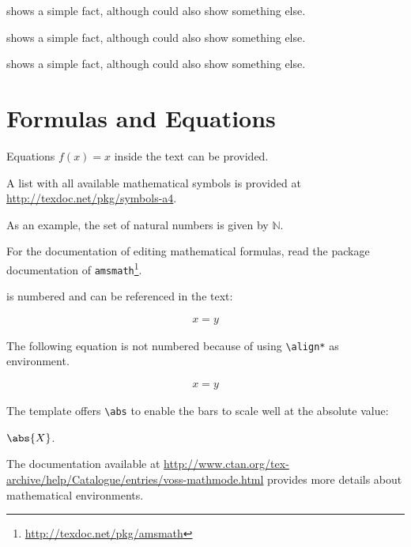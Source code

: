 \begin{ltgexample}
 shows a simple fact, although  could also show something else.

 shows a simple fact, although  could also show something else.

 shows a simple fact, although  could also show something else.
\end{ltgexample}

\section{Formulas and Equations}

\begin{ltgexample}
Equations $f(x)=x$ inside the text can be provided.
\end{ltgexample}

A list with all available mathematical symbols is provided at \url{http://texdoc.net/pkg/symbols-a4}.

\begin{ltgexample}
As an example, the set of natural numbers is given by $\mathbb{N}$.
\end{ltgexample}

For the documentation of editing mathematical formulas, read the package documentation of \texttt{amsmath}\footnote{\url{http://texdoc.net/pkg/amsmath}}.

 is numbered and can be referenced in the text:
\begin{ltgexample}
\begin{align}
  \label{eq:test}
  x = y
\end{align}
\end{ltgexample}

The following equation is not numbered because of using \texttt{\textbackslash align*} as environment.
\begin{ltgexample}
\begin{align*}
  x = y
\end{align*}
\end{ltgexample}

The template offers \verb+\abs+ to enable the bars to scale well at the absolute value:
\begin{ltgexample}
$\abs{X}$.
\end{ltgexample}

The documentation available at \url{http://www.ctan.org/tex-archive/help/Catalogue/entries/voss-mathmode.html} provides more details about mathematical environments.

